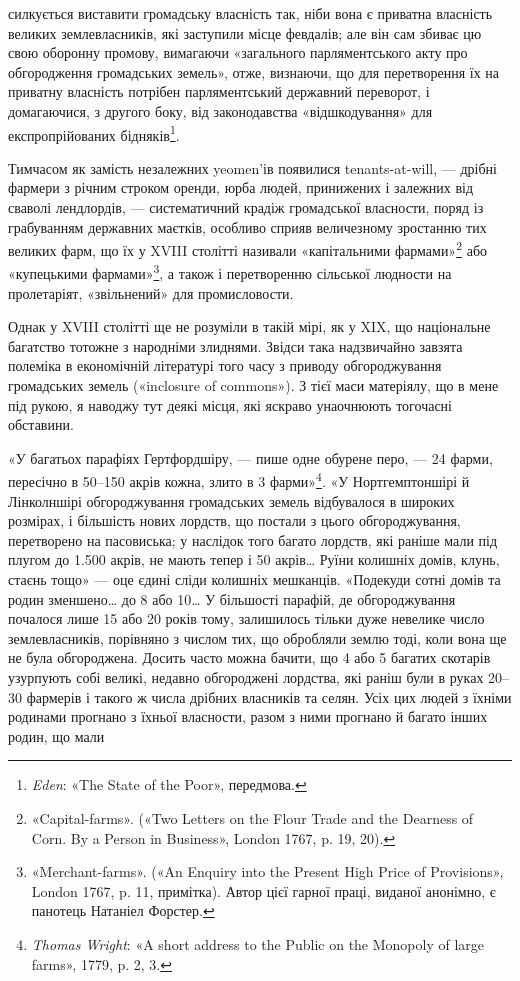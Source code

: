 \parcont{}  %
силкується виставити громадську власність так, ніби вона є
приватна власність великих землевласників, які заступили місце
февдалів; але він сам збиває цю свою оборонну промову, вимагаючи
«загального парляментського акту про обгородження громадських
земель», отже, визнаючи, що для перетворення їх на
приватну власність потрібен парляментський державний переворот,
і домагаючися, з другого боку, від законодавства «відшкодування»
для експропрійованих бідняків\footnote{
\emph{Eden}: «The State of the Poor», передмова.
}.

Тимчасом як замість незалежних yeomen’ів появилися tenants-at-will,
— дрібні фармери з річним строком оренди, юрба
людей, принижених і залежних від сваволі лендлордів, — систематичний
крадіж громадської власности, поряд із грабуванням
державних маєтків, особливо сприяв величезному зростанню
тих великих фарм, що їх у XVIII столітті називали «капітальними
фармами»\footnote{
«Capital-farms». («Two Letters on the Flour Trade and the Dearness
of Corn. By a Person in Business», London 1767, p. 19, 20).
} або «купецькими фармами»\footnote{
«Merchant-farms». («An Enquiry into the Present High Price
of Provisions», London 1767, p. 11, примітка). Автор цієї гарної праці,
виданої анонімно, є панотець Натаніел Форстер.
}, а також і перетворенню
сільської людности на пролетаріят, «звільнений» для
промисловости.

Однак у XVIII столітті ще не розуміли в такій мірі, як у
XIX, що національне багатство тотожне з народніми злиднями.
Звідси така надзвичайно завзята полеміка в економічній літературі
того часу з приводу обгороджування громадських земель
(«inclosure of commons»). З тієї маси матеріялу, що в мене під
рукою, я наводжу тут деякі місця, які яскраво унаочнюють тогочасні
обставини.

«У багатьох парафіях Гертфордшіру, — пише одне обурене
перо, — 24 фарми, пересічно в 50--150 акрів кожна, злито в
3 фарми»\footnote{
\emph{Thomas Wright}: «A short address to the Public on the Monopoly
of large farms», 1779, p. 2, 3.
}. «У Нортгемптоншірі й Лінколншірі обгороджування
громадських земель відбувалося в широких розмірах, і
більшість нових лордств, що постали з цього обгороджування,
перетворено на пасовиська; у наслідок того багато лордств, які
раніше мали під плугом до \num{1.500} акрів, не мають тепер і 50 акрів\dots{}
Руїни колишніх домів, клунь, стаєнь тощо» — оце єдині
сліди колишніх мешканців. «Подекуди сотні домів та родин
зменшено\dots{} до 8 або 10\dots{} У більшості парафій, де обгороджування
почалося лише 15 або 20 років тому, залишилось тільки дуже
невелике число землевласників, порівняно з числом тих, що
обробляли землю тоді, коли вона ще не була обгороджена. Досить
часто можна бачити, що 4 або 5 багатих скотарів узурпують
собі великі, недавно обгороджені лордства, які раніш були в
руках 20--30 фармерів і такого ж числа дрібних власників та
селян. Усіх цих людей з їхніми родинами прогнано з їхньої
власности, разом з ними прогнано й багато інших родин, що мали
\parbreak{}  %
